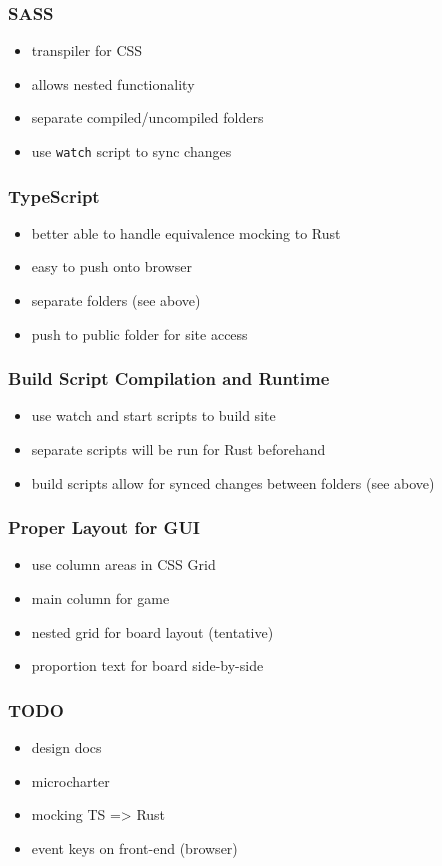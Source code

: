 \documentclass[11pt]{article}
\begin{document}
\subsubsection*{SASS}
\label{sec:orge1323af}
\begin{itemize}
\item transpiler for CSS
\item allows nested functionality
\item separate compiled/uncompiled folders
\item use \texttt{watch} script to sync changes
\end{itemize}
\subsubsection*{TypeScript}
\label{sec:org52dad2d}
\begin{itemize}
\item better able to handle equivalence mocking to Rust
\item easy to push onto browser
\item separate folders (see above)
\item push to public folder for site access
\end{itemize}
\subsubsection*{Build Script Compilation and Runtime}
\label{sec:orgbbdcabd}
\begin{itemize}
\item use watch and start scripts to build site
\item separate scripts will be run for Rust beforehand
\item build scripts allow for synced changes between folders (see above)
\end{itemize}
\subsubsection*{Proper Layout for GUI}
\label{sec:org6ba2711}
\begin{itemize}
\item use column areas in CSS Grid
\item main column for game
\item nested grid for board layout (tentative)
\item proportion text for board side-by-side
\end{itemize}
\subsubsection*{{\bfseries\sffamily TODO} }
\label{sec:org6d5347f}
\begin{itemize}
\item design docs
\item microcharter
\item mocking TS => Rust
\item event keys on front-end (browser)
\end{itemize}
\end{document}
